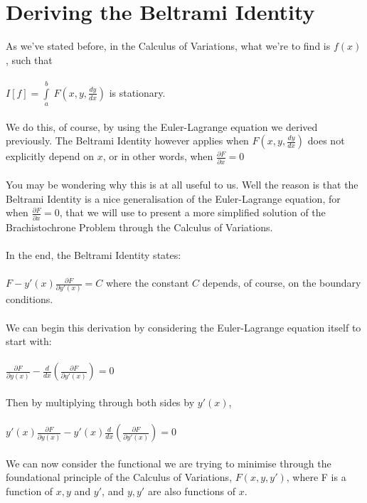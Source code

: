 \documentclass[12pt]{report}
\begin{document}
\section{Deriving the Beltrami Identity}
As we've stated before, in the Calculus of Variations, what we're to find is \(f(x)\), such that
\\
\\
\(I[f] = \int\limits_a^b\ F(x, y, \frac{dy}{dx})\) is stationary.
\\
\\
We do this, of course, by using the Euler-Lagrange equation we derived previously. The Beltrami Identity however applies when \(F(x, y, \frac{dy}{dx})\) does not explicitly depend on \(x\), or in other words, when \(\frac{\partial F}{\partial x} = 0\) 
\\
\\
You may be wondering why this is at all useful to us. Well the reason is that the Beltrami Identity is a nice generalisation of the Euler-Lagrange equation, for when \(\frac{\partial F}{\partial x} = 0\), that we will use to present a more simplified solution of the Brachistochrone Problem through the Calculus of Variations.
\\
\\
In the end, the Beltrami Identity states:
\\
\\
\(F-y'(x)\frac{\partial F}{\partial y'(x)} = C\) where the constant \(C\) depends, of course, on the boundary conditions.
\\
\\
We can begin this derivation by considering the Euler-Lagrange equation itself to start with:
\\
\\
\(\frac{\partial F}{\partial y(x)} - \frac{d}{dx}(\frac{\partial F}{\partial y'(x)}) = 0\)
\\
\\
Then by multiplying through both sides by \(y'(x)\),
\\
\\
\(y'(x)\frac{\partial F}{\partial y(x)} - y'(x)\frac{d}{dx}(\frac{\partial F}{\partial y'(x)}) = 0\)
\\
\\
We can now consider the functional we are trying to minimise through the foundational principle of the Calculus of Variations, \(F(x, y, y')\), where F is a function of \(x, y\) and \(y'\), and \(y, y'\) are also functions of \(x\).
\\
\\
\end{document}
